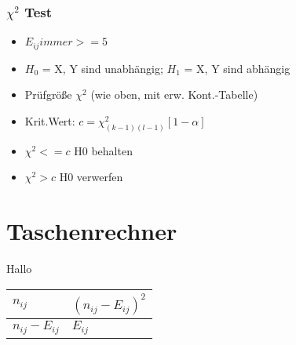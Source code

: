 \documentclass[a4paper]{article}
\begin{document}
\begin{landscape}
\begin{multicols}{4}
        \subsubsection*{$\chi^2$ Test}
        \begin{itemize}[noitemsep,nolistsep,leftmargin=*]
            \item $E_{ij} immer >= 5$
            \item $H_0$ = X, Y sind unabhängig; $H_1$ = X, Y sind abhängig 
            \item Prüfgröße $\chi^2$ (wie oben, mit erw. Kont.-Tabelle)
            \item Krit.Wert: $c = \chi^2_{(k-1)(l-1)}[1-\alpha]$
            \item $\chi^2 <= c$ H0 behalten
            \item $\chi^2 > c$ H0 verwerfen
        \end{itemize}
    \section*{Taschenrechner}
    Hallo
    
    \end{multicols}

    \begin{table}[]
        \begin{tabular}{l|l}
        $n_{ij}$ & $(n_{ij}-E_{ij})^2$           \\ \hline
        $n_{ij}-E_{ij}$           & $E_{ij}$
        \end{tabular}
        \end{table}
\end{landscape}
\end{document}
